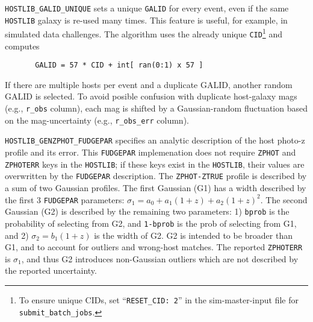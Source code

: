 \documentclass[12pt]{article}
\newcommand{\unc}{uncertainty}
\begin{document}
{{\tt HOSTLIB\_GALID\_UNIQUE} sets a unique {\tt GALID} for every event, 
even if the same {\tt HOSTLIB} galaxy is re-used many times. This 
feature is useful, for example, in simulated data challenges.
The algorithm uses the already unique 
{\tt CID}\footnote{To ensure unique CIDs, set ``{\tt RESET\_CID: 2}''
   in the sim-master-input file for {\tt submit\_batch\_jobs}.}
and computes 
\vspace{-0.1in}
\begin{verbatim}
       GALID = 57 * CID + int[ ran(0:1) x 57 ]
\end{verbatim}
\vspace{-0.1in}
If there are multiple hosts per event and a duplicate GALID,
another random GALID is selected. To avoid posible confusion with
duplicate host-galaxy mags (e.g., {\tt r\_obs} column), 
each mag is shifted by a Gaussian-random fluctuation based on the 
mag-uncertainty (e.g., {\tt r\_obs\_err} column).

{\tt HOSTLIB\_GENZPHOT\_FUDGEPAR} specifies an analytic description
of the host photo-z profile and its error.
This {\tt FUDGEPAR} implemenation does not require
{\tt ZPHOT} and {\tt ZPHOTERR} keys in the {\tt HOSTLIB}; 
if these keys exist in the {\tt HOSTLIB}, 
their values are overwritten by the
{\tt FUDGEPAR} description. 
The {\tt ZPHOT-ZTRUE} profile is described by a sum of two 
Gaussian profiles. The first Gaussian (G1) has a width described 
by the first 3 {\tt FUDGEPAR} parameters:
$\sigma_1 = a_0 + a_1(1+z) + a_2(1+z)^2$. 
The second Gaussian (G2) is described by the remaining two parameters:
1) {\tt bprob} is the probability of selecting from G2,
and {\tt 1-bprob} is the prob of selecting from G1,
and 2) $\sigma_2 = b_1(1+z)$ is the width of G2.
G2 is intended to be broader than G1, 
and to account for outliers and wrong-host matches.
The reported {\tt ZPHOTERR} is $\sigma_1$, and thus G2
introduces non-Gaussian outliers which are not described
by the reported \unc.

}
\end{document}
